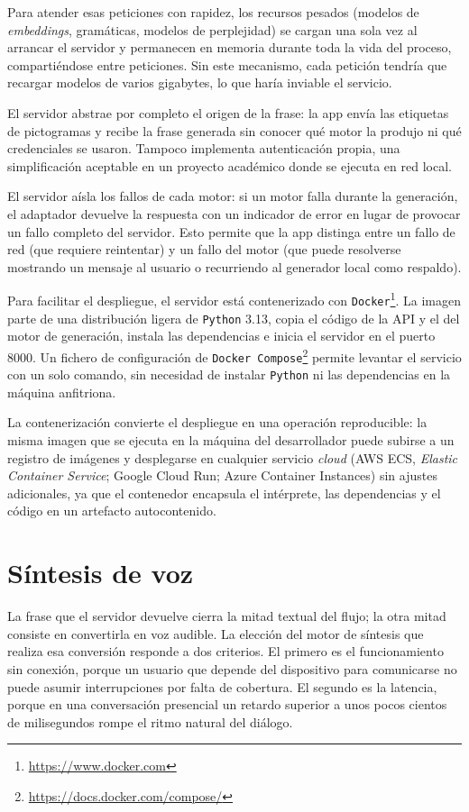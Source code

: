 Para atender esas peticiones con rapidez, los recursos pesados (modelos de \textit{embeddings}, gramáticas, modelos de perplejidad) se cargan una sola vez al arrancar el servidor y permanecen en memoria durante toda la vida del proceso, compartiéndose entre peticiones. Sin este mecanismo, cada petición tendría que recargar modelos de varios gigabytes, lo que haría inviable el servicio.

El servidor abstrae por completo el origen de la frase: la app envía las etiquetas de pictogramas y recibe la frase generada sin conocer qué motor la produjo ni qué credenciales se usaron. Tampoco implementa autenticación propia, una simplificación aceptable en un proyecto académico donde se ejecuta en red local.

El servidor aísla los fallos de cada motor: si un motor falla durante la generación, el adaptador devuelve la respuesta con un indicador de error en lugar de provocar un fallo completo del servidor. Esto permite que la app distinga entre un fallo de red (que requiere reintentar) y un fallo del motor (que puede resolverse mostrando un mensaje al usuario o recurriendo al generador local como respaldo).

Para facilitar el despliegue, el servidor está contenerizado con \texttt{Docker}\footnote{\url{https://www.docker.com}}. La imagen parte de una distribución ligera de \texttt{Python} 3.13, copia el código de la API y el del motor de generación, instala las dependencias e inicia el servidor en el puerto 8000. Un fichero de configuración de \texttt{Docker Compose}\footnote{\url{https://docs.docker.com/compose/}} permite levantar el servicio con un solo comando, sin necesidad de instalar \texttt{Python} ni las dependencias en la máquina anfitriona.

La contenerización convierte el despliegue en una operación reproducible: la misma imagen que se ejecuta en la máquina del desarrollador puede subirse a un registro de imágenes y desplegarse en cualquier servicio \textit{cloud} (AWS ECS, \textit{Elastic Container Service}; Google Cloud Run; Azure Container Instances) sin ajustes adicionales, ya que el contenedor encapsula el intérprete, las dependencias y el código en un artefacto autocontenido.

\section{Síntesis de voz}
\label{sec:app-tts}

La frase que el servidor devuelve cierra la mitad textual del flujo; la otra mitad consiste en convertirla en voz audible. La elección del motor de síntesis que realiza esa conversión responde a dos criterios. El primero es el funcionamiento sin conexión, porque un usuario que depende del dispositivo para comunicarse no puede asumir interrupciones por falta de cobertura. El segundo es la latencia, porque en una conversación presencial un retardo superior a unos pocos cientos de milisegundos rompe el ritmo natural del diálogo.


